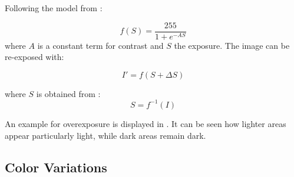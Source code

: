 Following the model from \cite{Carlson2018}:

\begin{equation}
f(S) = \frac{255}{1 + e^{-A S}}
\end{equation}
where $A$ is a constant term for contrast and $S$ the exposure.
The image can be re-exposed with:

\begin{equation}
I' = f(S+\Delta S)
\end{equation}

where $S$ is obtained from :
\begin{equation}
S = f^{-1}(I)
\end{equation}

An example for overexposure is displayed in . It can be seen how lighter areas appear particularly light, while dark areas remain dark.

\subsection{Color Variations}



